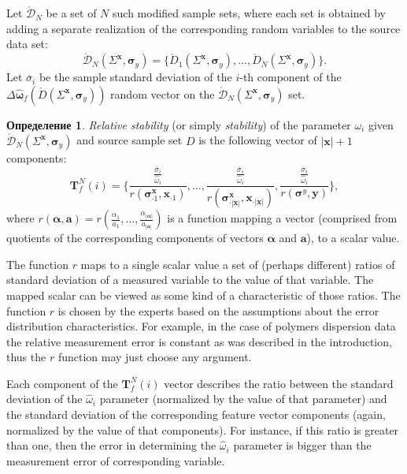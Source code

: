 \documentclass[11pt,a4paper]{article}
\theoremstyle{definition}
\newtheorem{defin}{Определение}
\begin{document}
Let $\acute{\mathcal{D}}_N$ be a set of $N$ such modified sample sets, where each
set is obtained by adding a separate realization of the corresponding random variables
to the source data set:
\[
  \acute{\mathcal{D}}_N (\Sigma^{\mathbf{x}}, \boldsymbol{\sigma}_y) = \{ \acute{D}_1 (\Sigma^{\mathbf{x}}, \boldsymbol{\sigma}_y), \dots, \acute{D}_N (\Sigma^{\mathbf{x}}, \boldsymbol{\sigma}_y) \}.
\]
Let $\overline{\sigma}_i$ be the sample standard deviation of the $i$-th component of the
$\Delta\hat{\boldsymbol{\omega}}_f(\acute{D} (\Sigma^{\mathbf{x}}, \boldsymbol{\sigma}_y) )$
random vector on the $\acute{\mathcal{D}}_N (\Sigma^{\mathbf{x}}, \boldsymbol{\sigma}_y)$ set.
\begin{defin}
\emph{Relative stability} (or simply \emph{stability}) of the parameter
$\omega_i$ given $\acute{\mathcal{D}}_N (\Sigma^{\mathbf{x}}, \boldsymbol{\sigma}_y)$
and source sample set $D$ is the following vector of $| \mathbf{x} | + 1$ components:
\begin{equation}
  \mathbf{T}^N_f(i) = \Big\{ \frac{\frac{\overline{\sigma}_i}{\hat{\omega}_i}}{r(\boldsymbol{\sigma}^\mathbf{x}_{\cdot 1}, \mathbf{x}_{\cdot 1})}, \dots, \frac{\frac{\overline{\sigma}_i}{\hat{\omega}_i}}{r(\boldsymbol{\sigma}^\mathbf{x}_{\cdot |\mathbf{x}|}, \mathbf{x}_{\cdot |\mathbf{x}|})}, \frac{\frac{\overline{\sigma}_i}{\hat{\omega}_i}}{r(\boldsymbol{\sigma}^y, \mathbf{y})} \Big\},
  \label{eq:t_rel}
\end{equation}
where $r(\boldsymbol{\alpha}, \mathbf{a}) = r(\frac{\alpha_1}{a_1}, \dots, \frac{\alpha_{|\boldsymbol{\alpha}|}}{a_{|\mathbf{a}|}})$ is
a function mapping a vector (comprised from quotients of the corresponding components of vectors $\boldsymbol{\alpha}$ and $\mathbf{a}$),
to a scalar value.
\end{defin}

The function $r$ maps to a single scalar value a set of (perhaps different) ratios of standard
deviation of a measured variable to the value of that variable. The mapped scalar can be
viewed as some kind of a characteristic of those ratios. The function $r$ is chosen by the
experts based on the assumptions about the error distribution characteristics. For example,
in the case of polymers dispersion data the relative measurement error is constant as was
described in the introduction, thus the $r$ function may just choose any argument.

Each component of the $\mathbf{T}^N_f(i)$ vector describes the ratio between the standard deviation
of the $\hat{\omega}_i$ parameter (normalized by the value of that parameter) and the standard
deviation of the corresponding feature vector components (again, normalized by the value of that components).
For instance, if this ratio is greater than one, then the error in determining the $\hat{\omega}_i$
parameter is bigger than the measurement error of corresponding variable.
\end{document}
